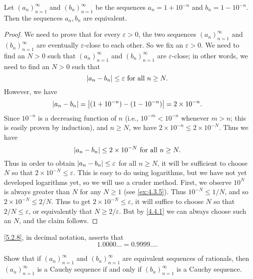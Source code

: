 \begin{prop}\label{5.2.8}
  Let \((a_n)_{n = 1}^{\infty}\) and \((b_n)_{n = 1}^{\infty}\) be the sequences \(a_n = 1 + 10^{-n}\) and \(b_n = 1 - 10^{-n}\).
  Then the sequences \(a_n, b_n\) are equivalent.
\end{prop}

\begin{proof}
  We need to prove that for every \(\varepsilon > 0\), the two sequences \((a_n)_{n = 1}^{\infty}\) and \((b_n)_{n = 1}^{\infty}\) are eventually \(\varepsilon\)-close to each other.
  So we fix an \(\varepsilon > 0\).
  We need to find an \(N > 0\) such that \((a_n)_{n = 1}^{\infty}\) and \((b_n)_{n = 1}^{\infty}\) are \(\varepsilon\)-close;
  in other words, we need to find an \(N > 0\) such that
  \[
    \left\lvert a_n - b_n\right\rvert \leq \varepsilon \text{ for all } n \geq N.
  \]
  However, we have
  \[
    \left\lvert a_n - b_n\right\rvert = \left\lvert(1 + 10^{-n}) - (1 - 10^{-n})\right\rvert = 2 \times 10^{-n}.
  \]
  Since \(10^{-n}\) is a decreasing function of \(n\) (i.e., \(10^{-m} < 10^{-n}\) whenever \(m > n\);
  this is easily proven by induction), and \(n \geq N\), we have \(2 \times 10^{-n} \leq 2 \times 10^{-N}\).
  Thus we have
  \[
    \left\lvert a_n - b_n\right\rvert \leq 2 \times 10^{-N} \text{ for all } n \geq N.
  \]
  Thus in order to obtain \(\left\lvert a_n - b_n\right\rvert \leq \varepsilon\) for all \(n \geq N\), it will be sufficient to choose \(N\) so that \(2 \times 10^{-N} \leq \varepsilon\).
  This is easy to do using logarithms, but we have not yet developed logarithms yet, so we will use a cruder method.
  First, we observe \(10^N\) is always greater than \(N\) for any \(N \geq 1\) (see \cref{ex:4.3.5}).
  Thus \(10^{-N} \leq 1 / N\), and so \(2 \times 10^{-N} \leq 2 / N\).
  Thus to get \(2 \times 10^{-N} \leq \varepsilon\), it will suffice to choose \(N\) so that \(2 / N \leq \varepsilon\), or equivalently that \(N \geq 2 / \varepsilon\).
  But by \cref{4.4.1} we can always choose such an \(N\), and the claim follows.
\end{proof}

\begin{rmk}\label{5.2.9}
  \cref{5.2.8}, in decimal notation, asserts that
  \[
    1.0000 \dots = 0.9999 \dots.
  \]
\end{rmk}

\exercisesection

\begin{ex}\label{ex:5.2.1}
  Show that if \((a_n)_{n = 1}^{\infty}\) and \((b_n)_{n = 1}^{\infty}\) are equivalent sequences of rationals, then \((a_n)_{n = 1}^{\infty}\) is a Cauchy sequence if and only if \((b_n)_{n = 1}^{\infty}\) is a Cauchy sequence.
\end{ex}

